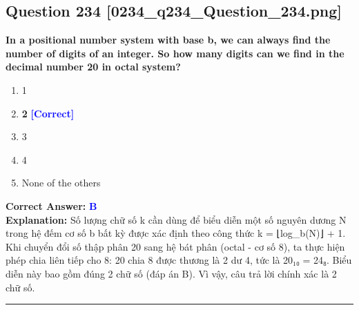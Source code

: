 \documentclass[11pt,a4paper]{article}
\begin{document}
\begin{minipage}{\textwidth}
\subsection*{Question 234 \quad \footnotesize{[0234\_q234\_Question\_234.png]}}
\noindent \textbf{In a positional number system with base b, we can always find the number of digits of an integer. So how many digits can we find in the decimal number 20 in octal system?}

\begin{enumerate}[label=\Alph*.]
    \item 1
    \item \textbf{2} \hfill \textcolor{blue}{\textbf{[Correct]}}
    \item 3
    \item 4
    \item None of the others
\end{enumerate}

\noindent \textbf{Correct Answer:} \textcolor{blue}{\textbf{B}} \\[2pt]
\noindent \textbf{Explanation:} Số lượng chữ số k cần dùng để biểu diễn một số nguyên dương N trong hệ đếm cơ số b bất kỳ được xác định theo công thức k = ⌊log\_b(N)⌋ + 1. Khi chuyển đổi số thập phân 20 sang hệ bát phân (octal - cơ số 8), ta thực hiện phép chia liên tiếp cho 8: 20 chia 8 được thương là 2 dư 4, tức là 20₁₀ = 24₈. Biểu diễn này bao gồm đúng 2 chữ số (đáp án B). Vì vậy, câu trả lời chính xác là 2 chữ số.

\par\vspace{0.3cm}
\hrule
\vspace{0.3cm}
\end{minipage}
\end{document}
